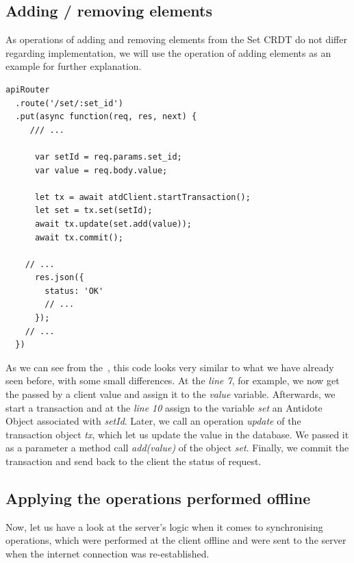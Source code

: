 \subsection*{Adding / removing elements}

As operations of adding and removing elements from the Set CRDT do not differ regarding implementation, we will use the operation of adding elements as an example for further explanation.

\begin{lstlisting}[caption={Code for applying an \textit{add} operation to a Set CRDT.}, label={lst:dev2}]
apiRouter
  .route('/set/:set_id')
  .put(async function(req, res, next) {
     /// ...

      var setId = req.params.set_id;
      var value = req.body.value;      

      let tx = await atdClient.startTransaction();
      let set = tx.set(setId);
      await tx.update(set.add(value));
      await tx.commit();

    // ...
      res.json({
        status: 'OK'
        // ...
      });
    // ...
  })
\end{lstlisting} 

As we can see from the~, this code looks very similar to what we have already seen before, with some small differences. At the \textit{line 7}, for example, we now get the passed by a client value and assign it to the \textit{value} variable. Afterwards, we start a transaction and at the \textit{line 10} assign to the variable \textit{set} an Antidote Object associated with \textit{setId}. Later, we call an operation \textit{update} of the transaction object \textit{tx}, which let us update the value in the database. We passed it as a parameter a method call \textit{add(value)} of the object \textit{set}. Finally, we commit the transaction and send back to the client the status of request.

\subsection*{Applying the operations performed offline}

Now, let us have a look at the server's logic when it comes to synchronising operations, which were performed at the client offline and were sent to the server when the internet connection was re-established.

